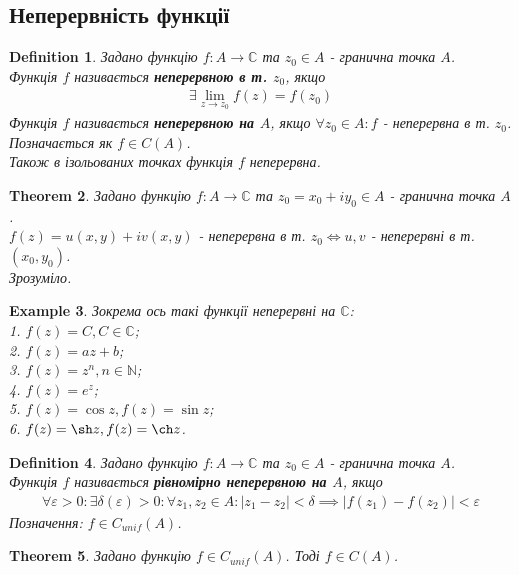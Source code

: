 \documentclass[a4paper, 10pt]{article}
\theoremstyle{theoremdd}
\newtheorem{theorem}{Theorem}[subsection]
\theoremstyle{theoremdd}
\newtheorem{definition}[theorem]{Definition}
\theoremstyle{theoremdd}
\theoremstyle{theoremdd}
\newtheorem{example}[theorem]{Example}
\theoremstyle{theoremdd}
\theoremstyle{theoremdd}
\theoremstyle{theoremdd}
\theoremstyle{theoremdd}
\begin{document}
\subsection{Неперервність функції}
\begin{definition}
Задано функцію $f: A \to \mathbb{C}$ та $z_0 \in A$ - гранична точка $A$.\\
Функція $f$ називається \textbf{неперервною в т. $z_0$}, якщо
\begin{align*}
\exists \lim_{z \to z_0} f(z) = f(z_0)
\end{align*}
Функція $f$ називається \textbf{неперервною на $A$}, якщо $\forall z_0 \in A: f$ - неперервна в т. $z_0$. Позначається як $f \in C(A)$.\\
Також в ізольованих точках функція $f$ неперервна.
\end{definition}

\begin{theorem}
Задано функцію $f: A \to \mathbb{C}$ та $z_0 = x_0 +iy_0 \in A$ - гранична точка $A$.\\
$f(z) = u(x,y) + iv(x,y)$ - неперервна в т. $z_0 \iff u,v$ - неперервні в т. $(x_0,y_0)$.\\
\textit{Зрозуміло.}
\end{theorem}

\begin{example}
Зокрема ось такі функції неперервні на $\mathbb{C}$:\\
1. $f(z) = C, C \in \mathbb{C}$;\\
2. $f(z) = az+b$;\\
3. $f(z) = z^n, n \in \mathbb{N}$;\\
4. $f(z) = e^z$;\\
5. $f(z) = \cos z, f(z) = \sin z$;\\
6. $f(z) = \sh z, f(z) = \ch z$.
\end{example}

\begin{definition}
Задано функцію $f: A \to \mathbb{C}$ та $z_0 \in A$ - гранична точка $A$.\\
Функція $f$ називається \textbf{рівномірно неперервною на $A$}, якщо
\begin{align*}
\forall \varepsilon > 0: \exists \delta(\varepsilon) > 0: \forall z_1,z_2 \in A: |z_1-z_2| < \delta \implies |f(z_1)-f(z_2)| < \varepsilon
\end{align*}
Позначення: $f \in C_{unif}(A)$.
\end{definition}

\begin{theorem}
Задано функцію $f \in C_{unif}(A)$. Тоді $f \in C(A)$.
\end{theorem}
\end{document}
